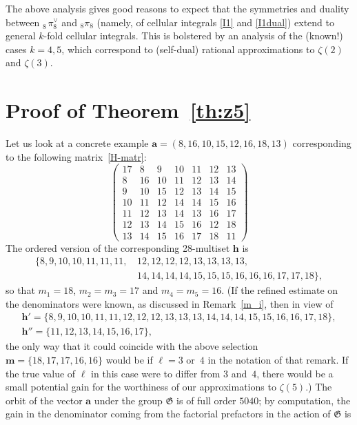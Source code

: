\documentclass[12pt,reqno]{amsart}
\theoremstyle{remark}
\newcommand\ba{\boldsymbol a}
\newcommand\bh{\boldsymbol h}
\newcommand\frG{\mathfrak G}
\begin{document}
The above analysis gives  good reasons to expect that the  symmetries and duality between ${}^{\phantom\vee}_8\!\pi^\vee_8$ and $_8\pi_8$ (namely, of cellular integrals \eqref{I1} and \eqref{I1dual}) extend to general $k$-fold cellular integrals. This is bolstered  by an analysis of the  (known!) cases $k=4,5$,  which 
correspond to (self-dual) rational approximations to $\zeta(2)$ and $\zeta(3)$.

\section{Proof of Theorem~\ref{th:z5}}
\label{sec:proof}

Let us look at a concrete example $\ba=(8, 16, 10, 15, 12, 16, 18, 13)$ corresponding to the following matrix~\eqref{H-matr}:
\[
\begin{pmatrix}
17 & 8 & 9 & 10 & 11 & 12 & 13 \\
8 & 16 & 10 & 11 & 12 & 13 & 14 \\
9 & 10 & 15 & 12 & 13 & 14 & 15 \\
10 & 11 & 12 & 14 & 14 & 15 & 16 \\
11 & 12 & 13 & 14 & 13 & 16 & 17 \\
12 & 13 & 14 & 15 & 16 & 12 & 18 \\
13 & 14 & 15 & 16 & 17 & 18 & 11
\end{pmatrix}
\]
The ordered version of the corresponding 28-multiset $\bh$ is
\begin{align*}
\{8, 9, 10, 10, 11, 11, 11,\, & 12, 12, 12, 12, 13, 13, 13, 13,
\\
& 14, 14, 14, 14, 15, 15, 15, 16, 16, 16, 17, 17, 18\},
\end{align*}
so that $m_1=18$, $m_2=m_3=17$ and $m_4=m_5=16$.
(If the  refined estimate on the denominators were known, as discussed in   Remark~\ref{m_i}, then in view of
\begin{gather*}
\bh'=\{8, 9, 10, 10, 11, 11, 12, 12, 12, 13, 13, 13, 14, 14, 14, 15, 15, 16, 16, 17, 18\},
\\
\bh''=\{11, 12, 13, 14, 15, 16, 17\},
\end{gather*}
the only way that it could coincide with the above selection $\boldsymbol m=\{18,17,17,16,16\}$ would be if $\ell=3$ or~$4$ in the notation of that remark.
If  the true value of $\ell$ in this case were to differ from $3$ and~$4$,  there would be a small potential gain for the worthiness of our approximations to $\zeta(5)$.)
The orbit of the vector $\ba$ under the group $\frG$ is of full order  $5040$; by computation, the gain in the denominator coming from the factorial prefactors in the action of $\frG$ is
\end{document}
